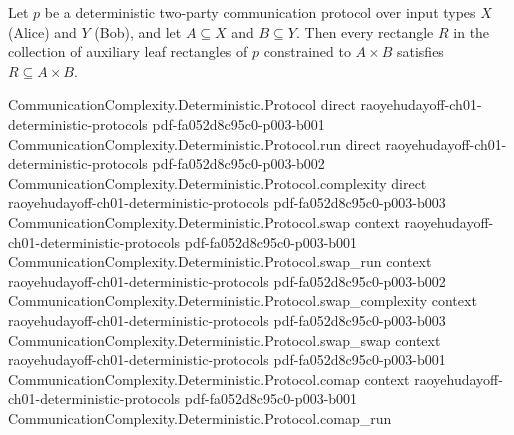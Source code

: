 \begin{lemma}
\label{CommunicationComplexity.Deterministic.Protocol.aux_subset}
\leanok
{}
Let $p$ be a deterministic two-party communication protocol over input types $X$ (Alice)
and $Y$ (Bob), and let $A \subseteq X$ and $B \subseteq Y$. Then every rectangle $R$ in
the collection of auxiliary leaf rectangles of $p$ constrained to $A \times B$ satisfies
$R \subseteq A \times B$.
\end{lemma}

\begin{lemma}
\label{CommunicationComplexity.Deterministic.Protocol.aux_cover}
\leanok
{}
\proofstep
  {CommunicationComplexity.Deterministic.Protocol}
  {direct}
  {raoyehudayoff-ch01-deterministic-protocols}
  {pdf-fa052d8c95c0-p003-b001}
\proofstep
  {CommunicationComplexity.Deterministic.Protocol.run}
  {direct}
  {raoyehudayoff-ch01-deterministic-protocols}
  {pdf-fa052d8c95c0-p003-b002}
\proofstep
  {CommunicationComplexity.Deterministic.Protocol.complexity}
  {direct}
  {raoyehudayoff-ch01-deterministic-protocols}
  {pdf-fa052d8c95c0-p003-b003}
\proofstep
  {CommunicationComplexity.Deterministic.Protocol.swap}
  {context}
  {raoyehudayoff-ch01-deterministic-protocols}
  {pdf-fa052d8c95c0-p003-b001}
\proofstep
  {CommunicationComplexity.Deterministic.Protocol.swap_run}
  {context}
  {raoyehudayoff-ch01-deterministic-protocols}
  {pdf-fa052d8c95c0-p003-b002}
\proofstep
  {CommunicationComplexity.Deterministic.Protocol.swap_complexity}
  {context}
  {raoyehudayoff-ch01-deterministic-protocols}
  {pdf-fa052d8c95c0-p003-b003}
\proofstep
  {CommunicationComplexity.Deterministic.Protocol.swap_swap}
  {context}
  {raoyehudayoff-ch01-deterministic-protocols}
  {pdf-fa052d8c95c0-p003-b001}
\proofstep
  {CommunicationComplexity.Deterministic.Protocol.comap}
  {context}
  {raoyehudayoff-ch01-deterministic-protocols}
  {pdf-fa052d8c95c0-p003-b001}
\proofstep
  {CommunicationComplexity.Deterministic.Protocol.comap_run}

\end{lemma}
